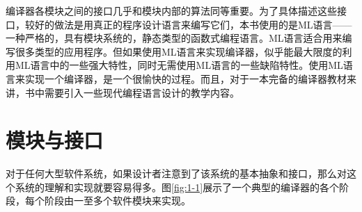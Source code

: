 \documentclass[cn,11pt,chinese]{elegantbook}
\begin{document}
编译器各模块之间的接口几乎和模块内部的算法同等重要。为了具体描述这些接口，较好的做法是用真正的程序设计语言来编写它们，本书使用的是ML语言——一种严格的，具有模块系统的，静态类型的函数式编程语言。ML语言适合用来编写很多类型的应用程序。但如果使用ML语言来实现编译器，似乎能最大限度的利用ML语言中的一些强大特性，同时无需使用ML语言的一些缺陷特性。使用ML语言来实现一个编译器，是一个很愉快的过程。而且，对于一本完备的编译器教材来讲，书中需要引入一些现代编程语言设计的教学内容。

\section{模块与接口}

对于任何大型软件系统，如果设计者注意到了该系统的基本抽象和接口，那么对这个系统的理解和实现就要容易得多。图\ref{fig:1-1}展示了一个典型的编译器的各个阶段，每个阶段由一至多个软件模块来实现。
\end{document}
